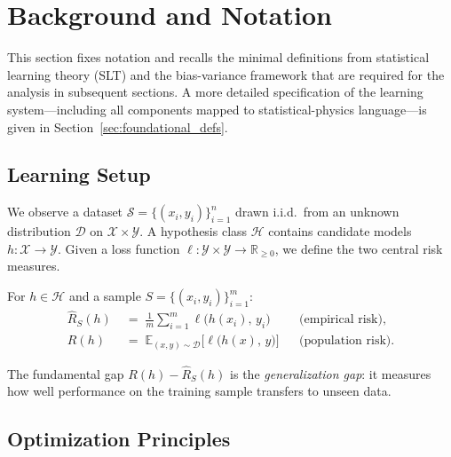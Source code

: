 \documentclass[
  journal=largetwo,
  year=2025,
  volume=37,
]{cup-journal}
\begin{document}

\section{Background and Notation}\label{sec:background}

This section fixes notation and recalls the minimal definitions from statistical learning theory (SLT) \cite{Vapnik1999-VAPTNO,STL_Hajek_Maxim_2021} and the bias-variance framework that are required for the analysis in subsequent sections. A more detailed specification of the learning system---including all components mapped to statistical-physics language---is given in Section~\ref{sec:foundational_defs}.

\subsection{Learning Setup}

We observe a dataset $\mathcal{S}=\{(x_i,y_i)\}_{i=1}^{n}$ drawn i.i.d.\ from an unknown distribution $\mathcal{D}$ on $\mathcal{X}\times\mathcal{Y}$. A hypothesis class $\mathcal{H}$ contains candidate models $h:\mathcal{X}\to\mathcal{Y}$. Given a loss function $\ell:\mathcal{Y}\times\mathcal{Y}\to\mathbb{R}_{\geq 0}$, we define the two central risk measures.

\begin{definition}\label{def:risks}
For $h\in\mathcal{H}$ and a sample $S=\{(x_i,y_i)\}_{i=1}^m$:
\begin{align}
    \hat{R}_{S}(h) &\;=\; \frac{1}{m}\sum_{i=1}^{m}\ell\bigl(h(x_i),\,y_i\bigr)
        & &\text{(empirical risk),} \label{eq:emp_risk}\\[4pt]
    R(h) &\;=\; \mathbb{E}_{(x,y)\sim\mathcal{D}}\bigl[\ell\bigl(h(x),\,y\bigr)\bigr]
        & &\text{(population risk).} \label{eq:pop_risk}
\end{align}
\end{definition}

The fundamental gap $R(h)-\hat{R}_S(h)$ is the \textit{generalization gap}: it measures how well performance on the training sample transfers to unseen data.

\subsection{Optimization Principles}
\end{document}
